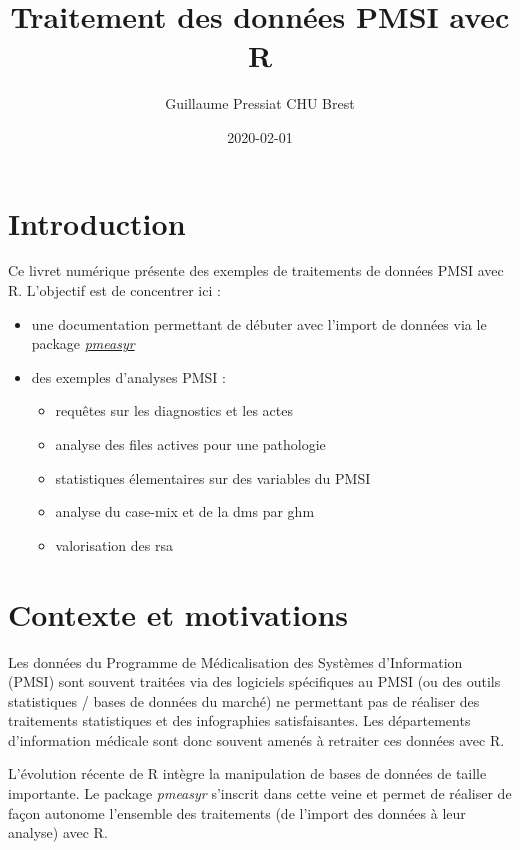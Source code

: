 \documentclass[]{book}
\title{Traitement des données PMSI avec R}
\author{Guillaume Pressiat \textbar{}\textbar{} CHU Brest}
\date{2020-02-01}
\providecommand{\tightlist}{%
  \setlength{\itemsep}{0pt}\setlength{\parskip}{0pt}}
\begin{document}
\maketitle

{
\setcounter{tocdepth}{1}
\tableofcontents
}
\hypertarget{introduction}{%
\chapter{Introduction}\label{introduction}}

Ce livret numérique présente des exemples de traitements de données PMSI avec R. L'objectif est de concentrer ici :

\begin{itemize}
\item
  une documentation permettant de débuter avec l'import de données via le package \href{https://github.com/GuillaumePressiat/pmeasyr}{\emph{pmeasyr}}
\item
  des exemples d'analyses PMSI :

  \begin{itemize}
  \tightlist
  \item
    requêtes sur les diagnostics et les actes
  \item
    analyse des files actives pour une pathologie
  \item
    statistiques élementaires sur des variables du PMSI
  \item
    analyse du case-mix et de la dms par ghm
  \item
    valorisation des rsa
  \end{itemize}
\end{itemize}

\hypertarget{contexte}{%
\chapter{Contexte et motivations}\label{contexte}}

Les données du Programme de Médicalisation des Systèmes d'Information (PMSI) sont souvent traitées via des logiciels spécifiques au PMSI (ou des outils statistiques / bases de données du marché) ne permettant pas de réaliser des traitements statistiques et des infographies satisfaisantes. Les départements d'information médicale sont donc souvent amenés à retraiter ces données avec R.

L'évolution récente de R intègre la manipulation de bases de données de taille importante. Le package \emph{pmeasyr} s'inscrit dans cette veine et permet de réaliser de façon autonome l'ensemble des traitements (de l'import des données à leur analyse) avec R.
\end{document}
